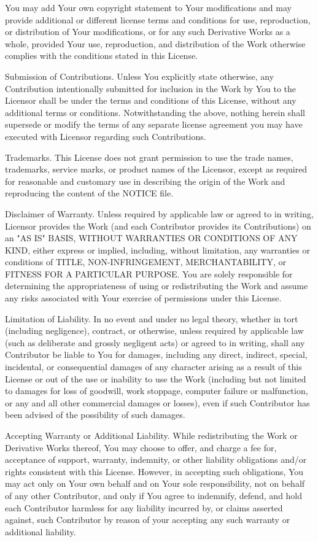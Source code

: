 \begin{DoxyEnumerate}
You may add Your own copyright statement to Your modifications and may provide additional or different license terms and conditions for use, reproduction, or distribution of Your modifications, or for any such Derivative Works as a whole, provided Your use, reproduction, and distribution of the Work otherwise complies with the conditions stated in this License.
\item Submission of Contributions. Unless You explicitly state otherwise, any Contribution intentionally submitted for inclusion in the Work by You to the Licensor shall be under the terms and conditions of this License, without any additional terms or conditions. Notwithstanding the above, nothing herein shall supersede or modify the terms of any separate license agreement you may have executed with Licensor regarding such Contributions.
\item Trademarks. This License does not grant permission to use the trade names, trademarks, service marks, or product names of the Licensor, except as required for reasonable and customary use in describing the origin of the Work and reproducing the content of the NOTICE file.
\item Disclaimer of Warranty. Unless required by applicable law or agreed to in writing, Licensor provides the Work (and each Contributor provides its Contributions) on an "{}\+AS IS"{} BASIS, WITHOUT WARRANTIES OR CONDITIONS OF ANY KIND, either express or implied, including, without limitation, any warranties or conditions of TITLE, NON-\/\+INFRINGEMENT, MERCHANTABILITY, or FITNESS FOR A PARTICULAR PURPOSE. You are solely responsible for determining the appropriateness of using or redistributing the Work and assume any risks associated with Your exercise of permissions under this License.
\item Limitation of Liability. In no event and under no legal theory, whether in tort (including negligence), contract, or otherwise, unless required by applicable law (such as deliberate and grossly negligent acts) or agreed to in writing, shall any Contributor be liable to You for damages, including any direct, indirect, special, incidental, or consequential damages of any character arising as a result of this License or out of the use or inability to use the Work (including but not limited to damages for loss of goodwill, work stoppage, computer failure or malfunction, or any and all other commercial damages or losses), even if such Contributor has been advised of the possibility of such damages.
\item Accepting Warranty or Additional Liability. While redistributing the Work or Derivative Works thereof, You may choose to offer, and charge a fee for, acceptance of support, warranty, indemnity, or other liability obligations and/or rights consistent with this License. However, in accepting such obligations, You may act only on Your own behalf and on Your sole responsibility, not on behalf of any other Contributor, and only if You agree to indemnify, defend, and hold each Contributor harmless for any liability incurred by, or claims asserted against, such Contributor by reason of your accepting any such warranty or additional liability.
\end{DoxyEnumerate}

